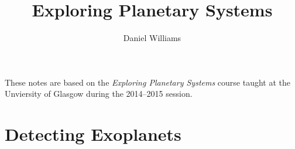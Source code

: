 \documentclass{momento}
\title{Exploring Planetary Systems}
\author{Daniel Williams}
\begin{document}
\maketitle

\tableofcontents

These notes are based on the \textit{Exploring Planetary Systems}
course taught at the Unviersity of Glasgow during the 2014--2015
session.

\chapter{Detecting Exoplanets}
\label{cha:detecting-exoplanets}




\appendices
\end{document}
